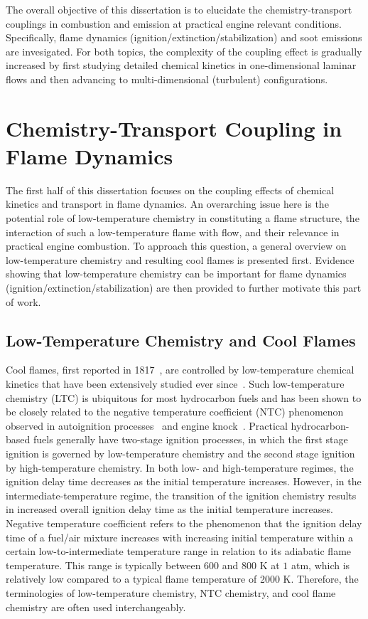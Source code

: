 The overall objective of this dissertation is to elucidate the chemistry-transport couplings in combustion and emission at practical engine relevant conditions.  Specifically, flame dynamics (ignition/extinction/stabilization) and soot emissions are invesigated.  For both topics, the complexity of the coupling effect is gradually increased by first studying detailed chemical kinetics in one-dimensional laminar flows and then advancing to multi-dimensional (turbulent) configurations.  

\section{Chemistry-Transport Coupling in Flame Dynamics}

The first half of this dissertation focuses on the coupling effects of chemical kinetics and transport in flame dynamics.  An overarching issue here is the potential role of low-temperature chemistry in constituting a flame structure, the interaction of such a low-temperature flame with flow, and their relevance in practical engine combustion.  To approach this question, a general overview on low-temperature chemistry and resulting cool flames is presented first.  Evidence showing that low-temperature chemistry can be important for flame dynamics (ignition/extinction/stabilization) are then provided to further motivate this part of work.

\subsection{Low-Temperature Chemistry and Cool Flames}\label{sec:intro-NTC-generic}

Cool flames, first reported in 1817~\cite{davy17}, are controlled by low-temperature chemical kinetics that have been extensively studied ever since~\cite{griffiths87}.  Such low-temperature chemistry (LTC) is ubiquitous for most hydrocarbon fuels and has been shown to be closely related to the negative temperature coefficient (NTC) phenomenon observed in autoignition processes~\cite{ciezki93,hwang08} and engine knock~\cite{griffiths02}.  Practical hydrocarbon-based fuels generally have two-stage ignition processes, in which the first stage ignition is governed by low-temperature chemistry and the second stage ignition by high-temperature chemistry.  In both low- and high-temperature regimes, the ignition delay time decreases as the initial temperature increases.  However, in the intermediate-temperature regime, the transition of the ignition chemistry results in increased overall ignition delay time as the initial temperature increases.  Negative temperature coefficient refers to the phenomenon that the ignition delay time of a fuel/air mixture increases with increasing initial temperature within a certain low-to-intermediate temperature range in relation to its adiabatic flame temperature.  This range is typically between $600$ and $800$ K at $1$ atm, which is relatively low compared to a typical flame temperature of 2000 K.  Therefore, the terminologies of low-temperature chemistry, NTC chemistry, and cool flame chemistry are often used interchangeably.  

